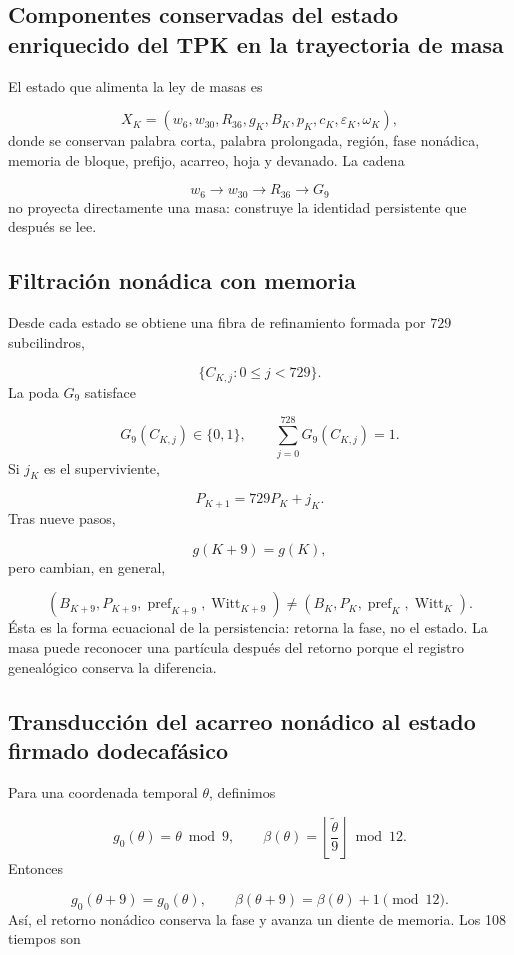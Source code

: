 \subsection{Componentes conservadas del estado enriquecido del TPK en la trayectoria de masa}
El estado que alimenta la ley de masas es

\[
 X_K=(w_6,w_{30},R_{36},g_K,B_K,p_K,c_K,\varepsilon_K,\omega_K),
\]
donde se conservan palabra corta, palabra prolongada, región, fase nonádica, memoria de bloque, prefijo, acarreo, hoja y devanado. La cadena

\[
 w_6\longrightarrow w_{30}\longrightarrow R_{36}
 \longrightarrow G_9
\]
no proyecta directamente una masa: construye la identidad persistente que después se lee.

\subsection{Filtración nonádica con memoria}
Desde cada estado se obtiene una fibra de refinamiento formada por \(729\) subcilindros,

\[
 \{C_{K,j}:0\le j<729\}.
\]
La poda \(G_9\) satisface

\[
 G_9(C_{K,j})\in\{0,1\},\qquad
 \sum_{j=0}^{728}G_9(C_{K,j})=1.
\]
Si \(j_K\) es el superviviente,

\[
 P_{K+1}=729P_K+j_K.
\]
Tras nueve pasos,

\[
 g(K+9)=g(K),
\]
pero cambian, en general,

\[
 (B_{K+9},P_{K+9},\operatorname{pref}_{K+9},
 \operatorname{Witt}_{K+9})
 \ne
 (B_K,P_K,\operatorname{pref}_K,\operatorname{Witt}_K).
\]
Ésta es la forma ecuacional de la persistencia: retorna la fase, no el estado. La masa puede reconocer una partícula después del retorno porque el registro genealógico conserva la diferencia.

\subsection{Transducción del acarreo nonádico al estado firmado dodecafásico}
Para una coordenada temporal \(\theta\), definimos

\[
 g_0(\theta)=\theta\bmod9,\qquad
 \beta(\theta)=
 \left\lfloor\frac{\widetilde\theta}{9}\right\rfloor\bmod12.
\]
Entonces

\[
 g_0(\theta+9)=g_0(\theta),\qquad
 \beta(\theta+9)=\beta(\theta)+1\pmod{12}.
\]
Así, el retorno nonádico conserva la fase y avanza un diente de memoria. Los 108 tiempos son

